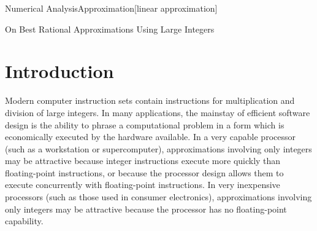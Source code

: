 \documentclass{esub2acm}
\begin{document}
 {Numerical Analysis}{Approximation}[linear approximation]
\begin{bottomstuff}
\permission
\end{bottomstuff}
     {On Best Rational Approximations Using Large Integers}
\maketitle


\section{Introduction}
Modern computer instruction sets contain instructions
for multiplication and division of large integers.  In many
applications, the mainstay of efficient software design is the ability
to phrase a computational problem in a form which is
economically executed by the hardware available.  In a very
capable processor (such as a workstation or supercomputer),
approximations involving only integers may be attractive because
integer instructions execute more quickly than
floating-point instructions, or because the processor design
allows them to execute
concurrently with floating-point instructions.  In very inexpensive
processors (such as those used in consumer electronics), approximations
involving only integers may be attractive because the processor
has no floating-point capability.
\end{document}
